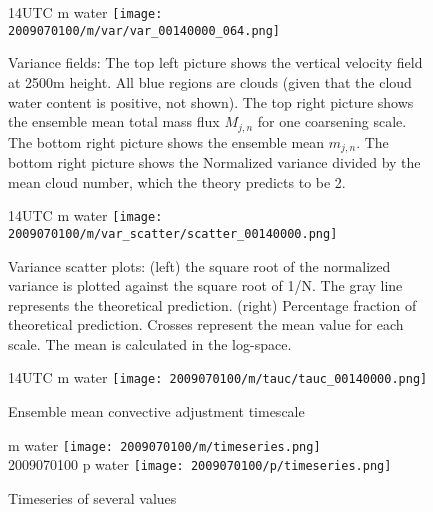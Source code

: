 \documentclass[a4paper, 12pt]{article}
\begin{document}
\begin{figure}[ht] \label{fig:case1_var_fields}
\noindent {} 14UTC m water
\texttt{[image: 2009070100/m/var/var\_00140000\_064.png]}\\
\caption{Variance fields:  The top left picture shows the vertical velocity field at 2500m height. All blue regions are clouds (given that the cloud water content is positive, not shown). The top right picture shows the ensemble mean total mass flux $M_{j,n}$ for one coarsening scale. The bottom right picture shows the ensemble mean $m_{j,n}$. The bottom right picture shows the Normalized variance divided by the mean cloud number, which the theory predicts to be 2.}
\end{figure}

\begin{figure}[ht] \label{fig:case1_var_scatter}
\noindent {} 14UTC m water
\texttt{[image: 2009070100/m/var\_scatter/scatter\_00140000.png]}\\
\caption{Variance scatter plots: (left) the square root of the normalized variance is plotted against the square root of 1/N. The gray line represents the theoretical prediction. (right) Percentage fraction of theoretical prediction. Crosses represent the mean value for each scale. The mean is calculated in the log-space.}
\end{figure}

\begin{figure}[ht] \label{fig:case1_tau_c}
\noindent {} 14UTC m water
\texttt{[image: 2009070100/m/tauc/tauc\_00140000.png]}\\
\caption{Ensemble mean convective adjustment timescale}
\end{figure}

\begin{figure}[ht] \label{fig:case1_timeseries}
\noindent {} m water
\texttt{[image: 2009070100/m/timeseries.png]}\\
2009070100 p water
\texttt{[image: 2009070100/p/timeseries.png]}\\
\caption{Timeseries of several values}
\end{figure}


\end{document}
